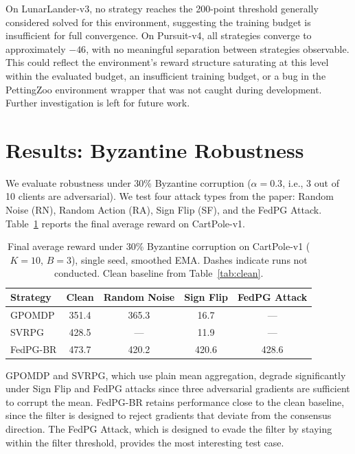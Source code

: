 \documentclass[a4paper, oneside]{discothesis}
\begin{document}
On LunarLander-v3, no strategy reaches the 200-point threshold generally considered solved for this environment, suggesting the training budget is insufficient for full convergence. On Pursuit-v4, all strategies converge to approximately $-46$, with no meaningful separation between strategies observable. This could reflect the environment's reward structure saturating at this level within the evaluated budget, an insufficient training budget, or a bug in the PettingZoo environment wrapper that was not caught during development. Further investigation is left for future work.

\section{Results: Byzantine Robustness}
\label{sec:exp:byz}

We evaluate robustness under 30\% Byzantine corruption ($\alpha = 0.3$, i.e., 3 out of 10 clients are adversarial). We test four attack types from the paper: Random Noise (RN), Random Action (RA), Sign Flip (SF), and the FedPG Attack. Table~\ref{tab:byz} reports the final average reward on CartPole-v1.

\begin{table}[h]
\centering
\caption{Final average reward under 30\% Byzantine corruption on CartPole-v1 ($K=10$, $B=3$), single seed, smoothed EMA. Dashes indicate runs not conducted. Clean baseline from Table~\ref{tab:clean}.}
\label{tab:byz}
\begin{tabular}{lcccc}
\hline
\textbf{Strategy} & \textbf{Clean} & \textbf{Random Noise} & \textbf{Sign Flip} & \textbf{FedPG Attack} \\
\hline
GPOMDP    & 351.4 & 365.3 & 16.7  & ---   \\
SVRPG    & 428.5 & ---   & 11.9  & ---   \\
FedPG-BR & 473.7 & 420.2 & 420.6 & 428.6 \\
\hline
\end{tabular}
\end{table}

GPOMDP and SVRPG, which use plain mean aggregation, degrade significantly under Sign Flip and FedPG attacks since three adversarial gradients are sufficient to corrupt the mean. FedPG-BR retains performance close to the clean baseline, since the filter is designed to reject gradients that deviate from the consensus direction. The FedPG Attack, which is designed to evade the filter by staying within the filter threshold, provides the most interesting test case.
\end{document}
